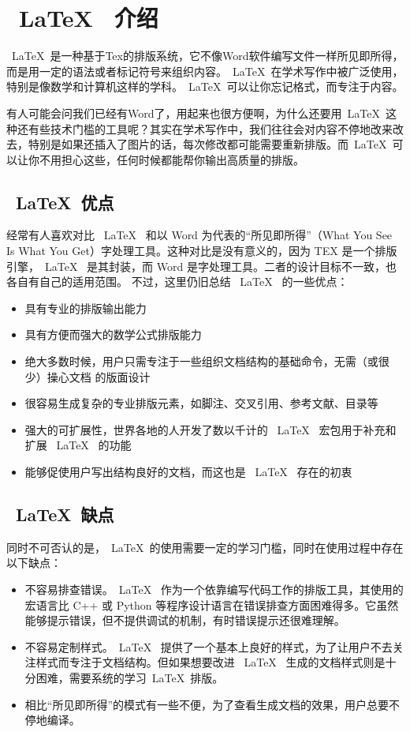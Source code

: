 \chapter{~\LaTeX~ 介绍}

~\LaTeX~是一种基于Tex的排版系统，它不像Word软件编写文件一样所见即所得，而是用一定的语法或者标记符号来组织内容。~\LaTeX~在学术写作中被广泛使用，特别是像数学和计算机这样的学科。~\LaTeX~可以让你忘记格式，而专注于内容。

有人可能会问我们已经有Word了，用起来也很方便啊，为什么还要用~\LaTeX~这种还有些技术门槛的工具呢？其实在学术写作中，我们往往会对内容不停地改来改去，特别是如果还插入了图片的话，每次修改都可能需要重新排版。而~\LaTeX~可以让你不用担心这些，任何时候都能帮你输出高质量的排版。

\section{~\LaTeX~优点}

经常有人喜欢对比 ~\LaTeX~ 和以 Word 为代表的“所见即所得”（What You See Is What You Get）字处理工具。这种对比是没有意义的，因为 TEX 是一个排版引擎，~\LaTeX~ 是其封装，而 Word 是字处理工具。二者的设计目标不一致，也各自有自己的适用范围。 不过，这里仍旧总结 ~\LaTeX~ 的一些优点：


\begin{itemize}
  \item 具有专业的排版输出能力
  \item 具有方便而强大的数学公式排版能力
  \item 绝大多数时候，用户只需专注于一些组织文档结构的基础命令，无需（或很少）操心文档 的版面设计
  \item 很容易生成复杂的专业排版元素，如脚注、交叉引用、参考文献、目录等
  \item 强大的可扩展性，世界各地的人开发了数以千计的 ~\LaTeX~ 宏包用于补充和扩展 ~\LaTeX~ 的功能
  \item 能够促使用户写出结构良好的文档，而这也是 ~\LaTeX~ 存在的初衷
\end{itemize}

\section{~\LaTeX~缺点}

同时不可否认的是，~\LaTeX~的使用需要一定的学习门槛，同时在使用过程中存在以下缺点：

\begin{itemize}
  \item 不容易排查错误。~\LaTeX~ 作为一个依靠编写代码工作的排版工具，其使用的宏语言比 C++ 或 Python 等程序设计语言在错误排查方面困难得多。它虽然能够提示错误，但不提供调试的机制，有时错误提示还很难理解。
  \item 不容易定制样式。~\LaTeX~ 提供了一个基本上良好的样式，为了让用户不去关注样式而专注于文档结构。但如果想要改进 ~\LaTeX~ 生成的文档样式则是十分困难，需要系统的学习~\LaTeX~排版。
  \item 相比“所见即所得”的模式有一些不便，为了查看生成文档的效果，用户总要不停地编译。
\end{itemize}

